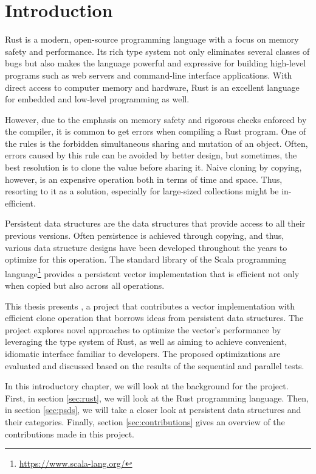 \chapter{Introduction}


Rust is a modern, open-source programming language with a focus on memory safety and performance. Its rich type system not only eliminates several classes of bugs but also makes the language powerful and expressive for building high-level programs such as web servers and command-line interface applications. With direct access to computer memory and hardware, Rust is an excellent language for embedded and low-level programming as well.

However, due to the emphasis on memory safety and rigorous checks enforced by the compiler, it is common to get errors when compiling a Rust program. One of the rules is the forbidden simultaneous sharing and mutation of an object. Often, errors caused by this rule can be avoided by better design, but sometimes, the best resolution is to clone the value before sharing it. Naive cloning by copying, however, is an expensive operation both in terms of time and space. Thus, resorting to it as a solution, especially for large-sized collections might be in-efficient.

Persistent data structures are the data structures that provide access to all their previous versions. Often persistence is achieved through copying, and thus, various data structure designs have been developed throughout the years to optimize for this operation. The standard library of the Scala programming language\footnote{\url{https://www.scala-lang.org/}} provides a persistent vector implementation that is efficient not only when copied but also across all operations.

This thesis presents \pvecrs{}, a project that contributes a vector implementation with efficient clone operation that borrows ideas from persistent data structures. The project explores novel approaches to optimize the vector’s performance by leveraging the type system of Rust, as well as aiming to achieve convenient, idiomatic interface familiar to developers. The proposed optimizations are evaluated and discussed based on the results of the sequential and parallel tests.

In this introductory chapter, we will look at the background for the \pvecrs{} project. First, in section \ref{sec:rust}, we will look at the Rust programming language. Then, in section \ref{sec:psds}, we will take a closer look at persistent data structures and their categories. Finally, section \ref{sec:contributions} gives an overview of the contributions made in this project.

